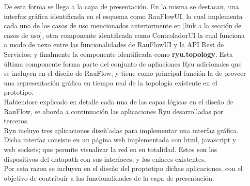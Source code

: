 De esta forma se llega a la capa de presentaci\'on. En la misma se destacan, una interfaz gr\'afica identificada en el esquema como RauFlowUI, la cual implementa cada uno de los casos de uso mencionados anteriormente en [link a la secci\'on de casos de uso], otra componente identificada como ControladorUI la cual funciona a modo de nexo entre las funcionalidades de RauFlowUI y la API Rest de Servicios; y finalmente la componente identificada como \textbf{ryu.topology}. Esta \'ultima componente forma parte del conjunto de apliaciones Ryu adicionales que se incluyen en el dise\~no de RauFlow, y tiene como principal funci\'on la de proveer una representaci\'on gr\'afica en tiempo real de la topolog\'ia existente en el prototipo.\\

Habiendose explicado en detalle cada una de las capas l\'ogicas en el dise\~no de RauFlow, se aborda a continuaci\'on las aplicaciones Ryu desarrolladas por terceros.\\

Ryu incluye tres aplicaciones dise\~n'adas para implementar una interfaz gr\'afica. Dicha interfaz consiste en un p\'agina web implementada con html, javascript y web sockets; que permite visualizar la red en su totalidad. Estos son los dispositivos del datapath con sus interfaces, y los enlaces existentes.\\
Por esta razon se incluyen en el dise\~no del proptotipo dichas aplicaciones, con el objetivo de contribu\'ir a las funcionalidades de la capa de presentaci\'on.


